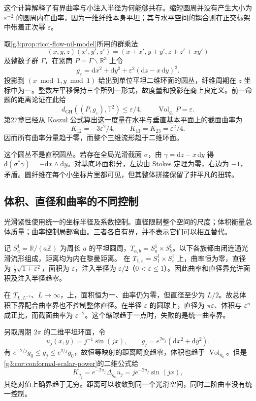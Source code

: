 这个计算解释了有界曲率与小注入半径为何能够共存。缩短圆周并没有产生大小为 \(\varepsilon^{-2}\) 的圆周内在曲率，因为一维纤维本身平坦；其与水平空间的耦合则在正交标架中带着正次幂 \(\varepsilon\)。

\begin{example}\label{g3:exm:nil-circle-collapse}
	取\cref{g3:prop:ricci-flow-nil-model}所用的群乘法
	\[
		(x,y,z)(x',y',z')=(x+x',y+y',z+z'+xy')
	\]
	及整数子群 \(\Gamma\)，在紧商 \(P=\Gamma\backslash\mathbb R^3\) 上令
	\[
		g_\varepsilon=\mathrm dx^2+\mathrm dy^2+
		\varepsilon^2(\mathrm dz-x\,\mathrm dy)^2.
	\]
	投影到 \((x\bmod1,y\bmod1)\) 给出到单位平坦二维环面的圆丛，纤维周期在 \(z\) 坐标中为一。整数左平移保持三个所列一形式，故度量和投影在商上良定义。前一命题的距离论证在此给
	\[
		d_{\mathrm{GH}}((P,g_\varepsilon),\mathbb T^2)\le\varepsilon/4,
		\qquad \operatorname{Vol}_{g_\varepsilon}P=\varepsilon.
	\]
	第27章已经从 Koszul 公式算出这一度量在水平与垂直基本平面上的截面曲率为
	\[
		K_{12}=-3\varepsilon^2/4,\qquad
		K_{13}=K_{23}=\varepsilon^2/4.
	\]
	因而所有曲率分量趋于零，而整个三维流形趋于二维环面。

	这个圆丛不是直积圆丛。若存在全局光滑截面 \(\sigma\)，由 \(\gamma=\mathrm dz-x\,\mathrm dy\) 得
	\(\mathrm d(\sigma^*\gamma)=-\mathrm dx\wedge\mathrm dy\)。对基底环面积分，左边由 Stokes 定理为零，右边为 \(-1\)，矛盾。圆纤维在每个小坐标片里都可见，但其整体拼接保留了非平凡的扭转。
\end{example}

\subsection{体积、直径和曲率的不同控制}
\label{g3:subsec:2902:02}
光滑紧性使用统一的坐标半径及系数控制。直径限制整个空间的尺度；体积衡量总体质量；曲率控制局部弯曲。三者各自有界，并不表示它们可以相互替代。

\begin{example}\label{g3:exm:collapse-control-counterexamples}
	记 \(S^1_a=\mathbb R/(a\mathbb Z)\) 为周长 \(a\) 的平坦圆周，\(T_{a,b}=S^1_a\times S^1_b\)。以下各族都由闭连通光滑流形组成，距离均为内在黎曼距离。
	在 \(T_{1,\varepsilon}=S^1_1\times S^1_\varepsilon\) 上，曲率恒为零，直径为 \(\tfrac12\sqrt{1+\varepsilon^2}\)，面积为 \(\varepsilon\)，注入半径为 \(\varepsilon/2\)（\(0<\varepsilon\le1\)）。因此曲率和直径界允许面积及注入半径趋零。

	\ProseParagraphBreak
	在 \(T_{L,L^{-1}}\)、\(L\to\infty\)，上，面积恒为一、曲率仍为零，但直径至少为 \(L/2\)。故总体积下界配合曲率界也不控制整体直径。在半径 \(\varepsilon\) 的圆球上，直径为 \(\pi\varepsilon\)、体积与 \(\varepsilon^n\) 成正比，而截面曲率为 \(\varepsilon^{-2}\)。这个缩球趋于一点时，失败的是统一曲率界。

	\ProseParagraphBreak
	另取周期 \(2\pi\) 的二维平坦环面，令
	\[
		u_j(x,y)=j^{-1}\sin(jx),\qquad
		g_j=e^{2u_j}(\mathrm dx^2+\mathrm dy^2).
	\]
	有 \(e^{-2/j}g_0\le g_j\le e^{2/j}g_0\)，故恒等映射的距离畸变趋零，体积也趋于 \(\operatorname{Vol}_{g_0}\)。但是\cref{g3:cor:conformal-scalar-power}的二维公式给
	\[
		K_{g_j}=e^{-2u_j}\Delta_{g_0}u_j
		=j e^{-2u_j}\sin(jx),
	\]
	其绝对值上确界趋于无穷。距离可以收敛到同一个光滑空间，同时二阶曲率没有统一控制。
\end{example}

